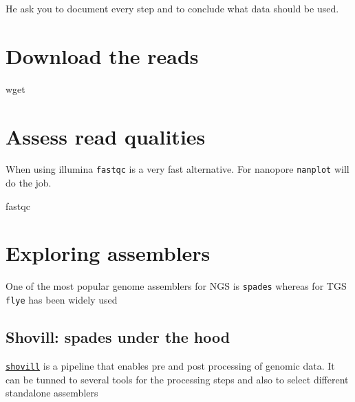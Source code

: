 \documentclass[
  letterpaper,
  DIV=11,
  numbers=noendperiod]{scrreprt}
\newenvironment{Shaded}{\begin{snugshade}}{\end{snugshade}}
\newcommand{\ExtensionTok}[1]{\textcolor[rgb]{0.00,0.46,0.62}{#1}}
\newcommand{\FunctionTok}[1]{\textcolor[rgb]{0.28,0.35,0.67}{#1}}
\begin{document}
He ask you to document every step and to conclude what data should be
used.

\hypertarget{download-the-reads}{%
\section*{Download the reads}\label{download-the-reads}}

\hypertarget{downloading-seqs}{%
\label{downloading-seqs}}%
\begin{Shaded}
\begin{Highlighting}[]
\FunctionTok{wget}
\end{Highlighting}
\end{Shaded}

\hypertarget{assess-read-qualities}{%
\section*{Assess read qualities}\label{assess-read-qualities}}

When using illumina \texttt{fastqc} is a very fast alternative. For
nanopore \texttt{nanplot} will do the job.

\begin{Shaded}
\begin{Highlighting}[]
\ExtensionTok{fastqc}
\end{Highlighting}
\end{Shaded}

\hypertarget{exploring-assemblers}{%
\section*{Exploring assemblers}\label{exploring-assemblers}}

One of the most popular genome assemblers for NGS is \texttt{spades}
whereas for TGS \texttt{flye} has been widely used

\hypertarget{shovill-spades-under-the-hood}{%
\subsection*{Shovill: spades under the
hood}\label{shovill-spades-under-the-hood}}

\href{https://github.com/tseemann/shovill}{\texttt{shovill}} is a
pipeline that enables pre and post processing of genomic data. It can be
tunned to several tools for the processing steps and also to select
different standalone assemblers
\end{document}

